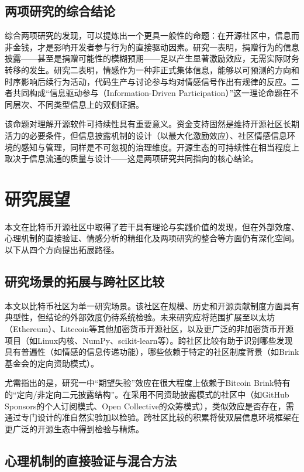 \subsection{两项研究的综合结论}

综合两项研究的发现，可以提炼出一个更具一般性的命题：在开源社区中，信息而非金钱，才是影响开发者参与行为的直接驱动因素。研究一表明，捐赠行为的信息披露——甚至是捐赠可能性的模糊预期——足以产生显著激励效应，无需实际财务转移的发生。研究二表明，情感作为一种非正式集体信息，能够以可预测的方向和时序影响后续行为活动，代码生产与讨论参与均对情感信号作出有规律的反应。二者共同构成“信息驱动参与（Information-Driven Participation）”这一理论命题在不同层次、不同类型信息上的双侧证据。

该命题对理解开源软件可持续性具有重要意义。资金支持固然是维持开源社区长期活力的必要条件，但信息披露机制的设计（以最大化激励效应）、社区情感信息环境的感知与管理，同样是不可忽视的治理维度。开源生态的可持续性在相当程度上取决于信息流通的质量与设计——这是两项研究共同指向的核心结论。

\section{研究展望}

本文在比特币开源社区中取得了若干具有理论与实践价值的发现，但在外部效度、心理机制的直接验证、情感分析的精细化及两项研究的整合等方面仍有深化空间。以下从四个方向提出拓展路径。

\subsection{研究场景的拓展与跨社区比较}

本文以比特币社区为单一研究场景。该社区在规模、历史和开源贡献制度方面具有典型性，但结论的外部效度仍待系统检验。未来研究应将范围扩展至以太坊（Ethereum）、Litecoin等其他加密货币开源社区，以及更广泛的非加密货币开源项目（如Linux内核、NumPy、scikit-learn等）。跨社区比较有助于识别哪些发现具有普遍性（如情感的信息传递功能），哪些依赖于特定的社区制度背景（如Brink基金会的定向资助模式）。

尤需指出的是，研究一中“期望失验”效应在很大程度上依赖于Bitcoin Brink特有的“定向/非定向二元披露结构”。在采用不同资助披露模式的社区中（如GitHub Sponsors的个人订阅模式、Open Collective的众筹模式），类似效应是否存在，需通过专门设计的准自然实验加以检验。跨社区比较的积累将使双层信息环境框架在更广泛的开源生态中得到检验与精炼。

\subsection{心理机制的直接验证与混合方法}

